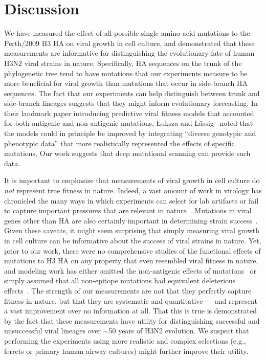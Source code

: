 \documentclass[9pt,twocolumn,twoside]{pnas-new}
\begin{document}
\section*{Discussion}
\label{sec:discussion}
We have measured the effect of all possible single amino-acid mutations to the Perth/2009 H3 HA on viral growth in cell culture, and demonstrated that these measurements are informative for distinguishing the evolutionary fate of human H3N2 viral strains in nature.
Specifically, HA sequences on the trunk of the phylogenetic tree tend to have mutations that our experiments measure to be more beneficial for viral growth than mutations that occur in side-branch HA sequences.
The fact that our experiments can help distinguish between trunk and side-branch lineages suggests that they might inform evolutionary forecasting.
In their landmark paper introducing predictive viral fitness models that accounted for both antigenic and non-antigenic mutations, {\L}uksza and L{\"a}ssig~\cite{luksza2014predictive} noted that the models could in principle be improved by integrating ``diverse genotypic and phenotypic data'' that more realistically represented the effects of specific mutations.
Our work suggests that deep mutational scanning can provide such data.

It is important to emphasize that measurements of viral growth in cell culture do \emph{not} represent true fitness in nature.
Indeed, a vast amount of work in virology has chronicled the many ways in which experiments can select for lab artifacts or fail to capture important pressures that are relevant in nature~\cite{daniels1985fusion,sun2010modifications,lee2013comparison,wu2017structural}.
Mutations in viral genes other than HA are also certainly important in determining strain success~\cite{memoli2009recent,raghwani2017selection}.
Given these caveats, it might seem surprising that simply measuring viral growth in cell culture can be informative about the success of viral strains in nature.
Yet, prior to our work, there were no comprehensive studies of the functional effects of mutations to H3 HA on any property that even resembled viral fitness in nature, and modeling work has either omitted the non-antigenic effects of mutations~\cite{sun2013using,harvey2016identification,neher2016prediction} or simply assumed that all non-epitope mutations had equivalent deleterious effects~\cite{luksza2014predictive}.
The strength of our measurements are not that they perfectly capture fitness in nature, but that they are systematic and quantitative --- and represent a vast improvement over no information at all.
That this is true is demonstrated by the fact that these measurements have utility for distinguishing successful and unsuccessful viral lineages over $\sim$50 years of H3N2 evolution.
We suspect that performing the experiments using more realistic and complex selections (e.g., ferrets or primary human airway cultures) might further improve their utility.
\end{document}
